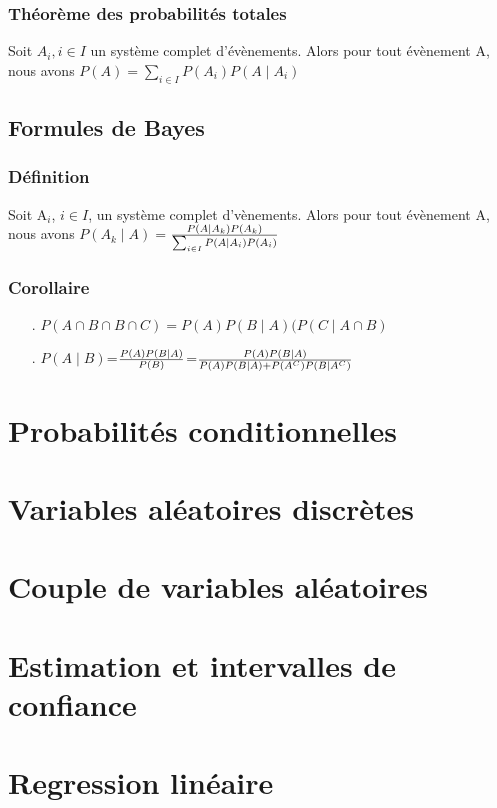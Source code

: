 \documentclass{article}
\begin{document}
            \subsubsection{Théorème des probabilités totales}
                Soit $A_i, i \in I$ un système complet d'évènements. Alors pour tout évènement A, nous avons
                $P(A)=\sum_{i \in I}P(A_i)P(A \mid A_i)$
        \subsection{Formules de Bayes}
            \subsubsection{Définition}
                Soit A$_i$, $i \in I$, un système complet d'vènements. Alors pour tout évènement A, nous avons
                $P(A_k \mid A)=$${P(A \mid A_k)P(A_k)}\over{\sum_{i \in I}P(A \mid A_i)P(A_i)}$
            \subsubsection{Corollaire}
                \begin{itemize}
                    \item[.] $P(A \cap B \cap B \cap C)=P(A)P(B \mid A)(P(C \mid A \cap B)$
                    \item[.] $P(A \mid B)$=${P(A)P(B \mid A)}\over{P(B)}$=${P(A)P(B \mid A)}\over{P(A)P(B \mid A)+P(A^C)P(B \mid A^C)}$
                \end{itemize}

    \section{Probabilités conditionnelles}
    \section{Variables aléatoires discrètes}
    \section{Couple de variables aléatoires}
    \section{Estimation et intervalles de confiance}
    \section{Regression linéaire}
\end{document}
